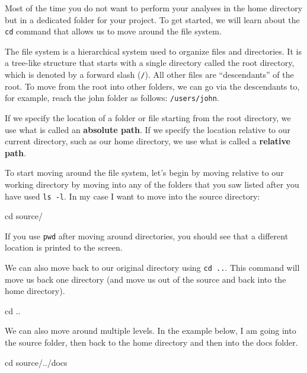 \documentclass[
  letterpaper,
  DIV=11,
  numbers=noendperiod]{scrreprt}
\newenvironment{Shaded}{}{}
\newcommand{\BuiltInTok}[1]{\textcolor[rgb]{0.84,0.23,0.29}{#1}}
\newcommand{\NormalTok}[1]{\textcolor[rgb]{0.14,0.16,0.18}{#1}}
\begin{document}
Most of the time you do not want to perform your analyses in the home
directory but in a dedicated folder for your project. To get started, we
will learn about the \texttt{cd} command that allows us to move around
the file system.

The file system is a hierarchical system used to organize files and
directories. It is a tree-like structure that starts with a single
directory called the root directory, which is denoted by a forward slash
(\texttt{/}). All other files are ``descendants'' of the root. To move
from the root into other folders, we can go via the descendants to, for
example, reach the john folder as follows: \texttt{/users/john}.

If we specify the location of a folder or file starting from the root
directory, we use what is called an \textbf{absolute path}. If we
specify the location relative to our current directory, such as our home
directory, we use what is called a \textbf{relative path}.

To start moving around the file system, let's begin by moving relative
to our working directory by moving into any of the folders that you saw
listed after you have used \texttt{ls\ -l}. In my case I want to move
into the source directory:

\begin{Shaded}
\begin{Highlighting}[]
\BuiltInTok{cd}\NormalTok{ source/}
\end{Highlighting}
\end{Shaded}

If you use \texttt{pwd} after moving around directories, you should see
that a different location is printed to the screen.

We can also move back to our original directory using \texttt{cd\ ..}.
This command will move us back one directory (and move us out of the
source and back into the home directory).

\begin{Shaded}
\begin{Highlighting}[]
\BuiltInTok{cd}\NormalTok{ ..}
\end{Highlighting}
\end{Shaded}

We can also move around multiple levels. In the example below, I am
going into the source folder, then back to the home directory and then
into the docs folder.

\begin{Shaded}
\begin{Highlighting}[]
\BuiltInTok{cd}\NormalTok{ source/../docs}
\end{Highlighting}
\end{Shaded}
\end{document}

